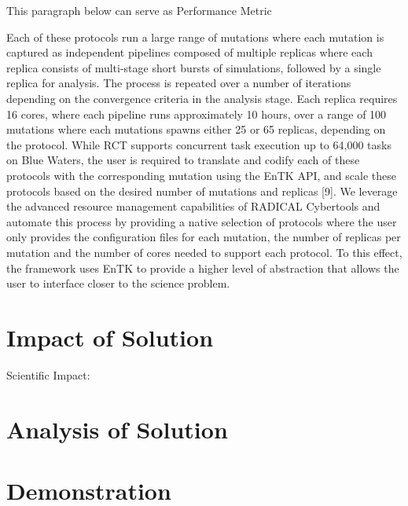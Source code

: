 \documentclass[conference]{IEEEtran}
\begin{document}
This paragraph below can serve as Performance Metric 

Each of these protocols run a large range of mutations where each 
mutation is captured as independent pipelines composed of multiple replicas 
where each replica consists of multi-stage short bursts 
of simulations, followed by a single replica for analysis. The process is 
repeated over a number of iterations depending on the convergence criteria 
in the analysis stage. Each replica requires 16 cores, where each pipeline 
runs approximately 10 hours, over a range of 100 mutations where each mutations 
spawns either 25 or 65 replicas, depending on the protocol.                        
While RCT supports concurrent task execution up to 64,000 tasks on Blue Waters, 
the user is required to translate and codify each of these protocols with the 
corresponding mutation using the EnTK API, and scale these protocols 
based on the desired number of mutations and replicas [9]. We leverage 
the advanced resource management capabilities of RADICAL Cybertools and 
automate this process by providing a native selection of protocols where 
the user only provides the configuration files for each mutation, the number 
of replicas per mutation and the number of cores needed to support each 
protocol. To this effect, the framework uses EnTK to provide a higher level of 
abstraction that allows the user to interface closer to the science problem.
                
       
\section{Impact of Solution}\label{sec:impact}

Scientific Impact: 


\section{Analysis of Solution}\label{sec:analysis}



\section{Demonstration}\label{sec:demo}




\end{document}
